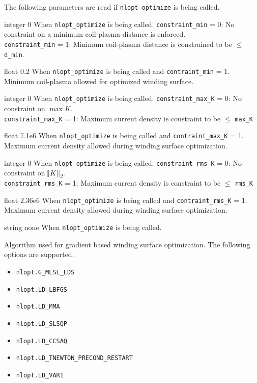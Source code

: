 The following parameters are read if \texttt{nlopt\_optimize} is being called. 

{integer}
{0}
{When \texttt{nlopt\_optimize} is being called.}
{\texttt{constraint\_min} = 0: No constraint on a minimum coil-plasma distance is enforced. \\
 \texttt{constraint\_min} = 1: Minimum coil-plasma distance is constrained to be $\leq$ \texttt{d\_min}. }
 
\myhrule

{float}
{0.2}
{When \texttt{nlopt\_optimize} is being called and \texttt{contraint\_min} = 1.}
{Minimum coil-plasma allowed for optimized winding surface.}
 
 \myhrule
 
{integer}
{0}
{When \texttt{nlopt\_optimize} is being called.}
{\texttt{constraint\_max\_K} = 0: No constraint on $\max K$. \\
 \texttt{constraint\_max\_K} = 1: Maximum current density is constraint to be $\leq$ \texttt{max\_K}}
 
\myhrule

{float}
{7.1e6}
{When \texttt{nlopt\_optimize} is being called and \texttt{contraint\_max\_K} = 1.}
{Maximum current density allowed during winding surface optimization. }

\myhrule

{integer}
{0}
{When \texttt{nlopt\_optimize} is being called.}
{\texttt{constraint\_rms\_K} = 0: No constraint on $\norm{K}_2$. \\
 \texttt{constraint\_rms\_K} = 1: Maximum current density is constraint to be $\leq$ \texttt{rms\_K}}
 
\myhrule

{float}
{2.36e6}
{When \texttt{nlopt\_optimize} is being called and \texttt{contraint\_rms\_K} = 1.}
{Maximum current density allowed during winding surface optimization. }

\myhrule

{string}
{none}
{When \texttt{nlopt\_optimize} is being called. }
{Algorithm used for gradient based winding surface optimization. The following options are supported.
\begin{itemize}
\item \texttt{nlopt.G\_MLSL\_LDS}
\item \texttt{nlopt.LD\_LBFGS}
\item \texttt{nlopt.LD\_MMA}
\item \texttt{nlopt.LD\_SLSQP} 
\item \texttt{nlopt.LD\_CCSAQ}
\item \texttt{nlopt.LD\_TNEWTON\_PRECOND\_RESTART}
\item \texttt{nlopt.LD\_VAR1}
\end{itemize}
}


